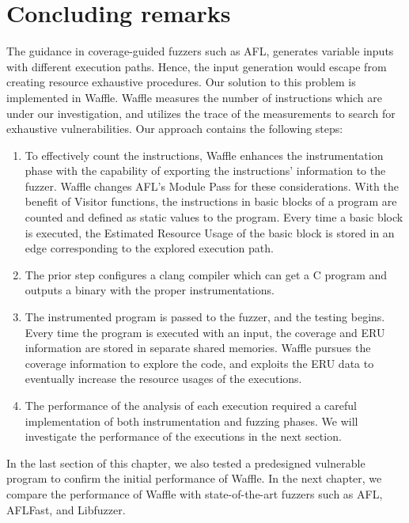 \section{Concluding remarks}

The guidance in coverage-guided fuzzers such as AFL, generates variable inputs with different execution paths. Hence, the input generation would escape from creating resource exhaustive procedures. Our solution to this problem is implemented in Waffle. Waffle measures the number of instructions which are under our investigation, and utilizes the trace of the measurements to search for exhaustive vulnerabilities. Our approach contains the following steps: 

\begin{enumerate}
    \item To effectively count the instructions, Waffle enhances the instrumentation phase with the capability of exporting the instructions' information to the fuzzer. Waffle changes AFL's Module Pass for these considerations. With the benefit of Visitor functions, the instructions in basic blocks of a program are counted and defined as static values to the program. Every time a basic block is executed, the Estimated Resource Usage of the basic block is stored in an edge corresponding to the explored execution path.
    \item The prior step configures a clang compiler which can get a C program and outputs a binary with the proper instrumentations.
    \item The instrumented program is passed to the fuzzer, and the testing begins. Every time the program is executed with an input, the coverage and ERU information are stored in separate shared memories. Waffle pursues the coverage information to explore the code, and exploits the ERU data to eventually increase the resource usages of the executions.
    \item The performance of the analysis of each execution required a careful implementation of both instrumentation and fuzzing phases. We will investigate the performance of the executions in the next section.
\end{enumerate}

In the last section of this chapter, we also tested a predesigned vulnerable program to confirm the initial performance of Waffle. In the next chapter, we compare the performance of Waffle with state-of-the-art fuzzers such as AFL, AFLFast, and Libfuzzer.